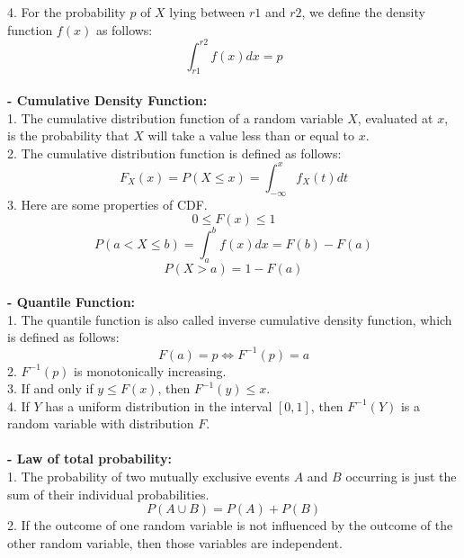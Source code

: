 \documentclass{article}
\begin{document}
\begin{enumerate}[S1 - ]
    4. For the probability $p$ of $X$ lying between $r1$ and $r2$, we define the density function $f(x)$ as follows:
    \begin{equation*}
    \int_{r1}^{r2} f(x)dx = p
    \end{equation*}
    \\
    \textbf{- Cumulative Density Function:}\\
    1. The cumulative distribution function of a  random variable $X$, evaluated at $x$, is the probability that $X$ will take a value less than or equal to $x$.\\
    2. The cumulative distribution function is defined as follows:
    \begin{equation*}
    F_{X}(x) = P(X \leq x) = \int_{-\infty}^{x} f_{X}(t)dt
    \end{equation*}
    3. Here are some properties of CDF.
    \begin{equation*}
    0 \leq F(x) \leq 1
    \end{equation*}
    \begin{equation*}
    P(a<X\leq b) = \int_{a}^{b} f(x)dx = F(b)-F(a)
    \end{equation*}
    \begin{equation*}
    P(X > a) = 1-F(a)
    \end{equation*}
    \\
    \textbf{- Quantile Function:}\\
    1. The quantile function is also called inverse cumulative density function, which is defined as follows:
    \begin{equation*}
    F(a) = p \Leftrightarrow F^{-1}(p) =a
    \end{equation*}
    2. $F^{-1}(p)$ is monotonically increasing.\\
    3. If and only if $y \leq F(x)$, then $F^{-1}(y) \leq x$.\\
    4. If $Y$ has a uniform distribution in the interval $[0, 1]$, then $F^{-1}(Y)$ is a
    random variable with distribution $F$.\\
    \\
    \textbf{- Law of total probability:}\\
    1. The probability of two mutually exclusive events $A$ and $B$ occurring is just the sum of their individual probabilities.
    \begin{equation*}
    P(A \cup B) = P(A) + P(B)
    \end{equation*}
    2. If the outcome of one random variable is not influenced by the outcome of the other random variable, then those variables are independent.

\end{enumerate}
\end{document}
